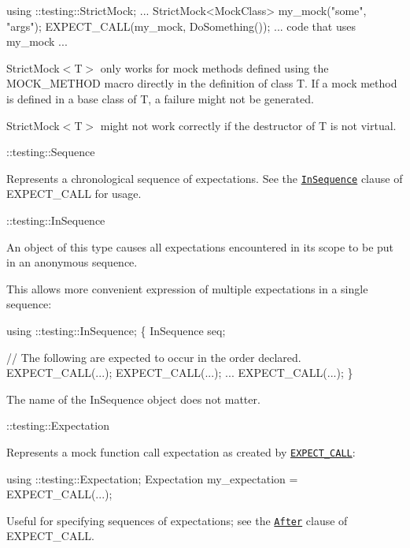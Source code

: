 \begin{DoxyCode}
using ::testing::StrictMock;
...
StrictMock<MockClass> my\_mock(\textcolor{stringliteral}{"some"}, \textcolor{stringliteral}{"args"});
EXPECT\_CALL(my\_mock, DoSomething());
... code that uses my\_mock ...
\end{DoxyCode}


{\ttfamily Strict\+Mock$<$T$>$} only works for mock methods defined using the {\ttfamily M\+O\+C\+K\+\_\+\+M\+E\+T\+H\+OD} macro directly in the definition of class {\ttfamily T}. If a mock method is defined in a base class of {\ttfamily T}, a failure might not be generated.

{\ttfamily Strict\+Mock$<$T$>$} might not work correctly if the destructor of {\ttfamily T} is not virtual.

{\ttfamily \+::testing\+::\+Sequence}

Represents a chronological sequence of expectations. See the \href{#EXPECT_CALL.InSequence}{\tt {\ttfamily In\+Sequence}} clause of {\ttfamily E\+X\+P\+E\+C\+T\+\_\+\+C\+A\+LL} for usage.

{\ttfamily \+::testing\+::\+In\+Sequence}

An object of this type causes all expectations encountered in its scope to be put in an anonymous sequence.

This allows more convenient expression of multiple expectations in a single sequence\+:


\begin{DoxyCode}
using ::testing::InSequence;
\{
  InSequence seq;

  \textcolor{comment}{// The following are expected to occur in the order declared.}
  EXPECT\_CALL(...);
  EXPECT\_CALL(...);
  ...
  EXPECT\_CALL(...);
\}
\end{DoxyCode}


The name of the {\ttfamily In\+Sequence} object does not matter.

{\ttfamily \+::testing\+::\+Expectation}

Represents a mock function call expectation as created by \href{#EXPECT_CALL}{\tt {\ttfamily E\+X\+P\+E\+C\+T\+\_\+\+C\+A\+LL}}\+:


\begin{DoxyCode}
using ::testing::Expectation;
Expectation my\_expectation = EXPECT\_CALL(...);
\end{DoxyCode}


Useful for specifying sequences of expectations; see the \href{#EXPECT_CALL.After}{\tt {\ttfamily After}} clause of {\ttfamily E\+X\+P\+E\+C\+T\+\_\+\+C\+A\+LL}.

